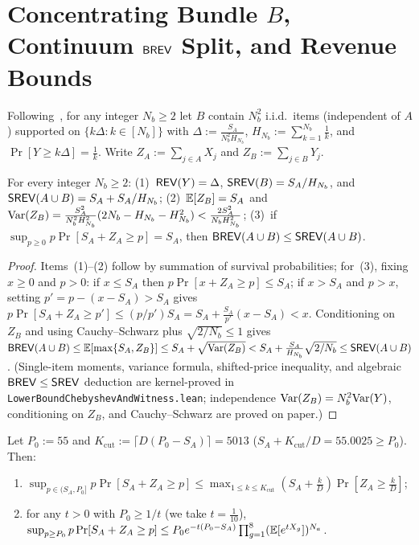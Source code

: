 \section{Concentrating Bundle \texorpdfstring{$B$}{B}, Continuum \texorpdfstring{$\mathsf{BREV}$}{BREV} Split, and Revenue Bounds}\label{sec:lb-bundle}

Following~\cite[Appendix~D]{GiannakopoulosHahn26}, for any integer $N_b \ge 2$ let $B$ contain $N_b^2$ i.i.d.\ items (independent of $A$) supported on $\{k\Delta : k \in [N_b]\}$ with $\Delta := \frac{S_A}{N_b^2 H_{N_b}}$, $H_{N_b} := \sum_{k=1}^{N_b} \frac{1}{k}$, and $\Pr[Y \ge k\Delta] = \frac{1}{k}$. Write $Z_A := \sum_{j\in A} X_j$ and $Z_B := \sum_{j\in B} Y_j$.

\begin{lemma}\label{lem:b-bundle}
For every integer $N_b \ge 2$:
(1)~$\mathsf{REV}(Y) = \Delta$, $\mathsf{SREV}(B) = S_A/H_{N_b}$, and $\mathsf{SREV}(A\cup B) = S_A + S_A/H_{N_b}$;
(2)~$\mathbb{E}[Z_B] = S_A$ and $\mathrm{Var}(Z_B) = \frac{S_A^2}{N_b^2 H_{N_b}^2}(2N_b - H_{N_b} - H_{N_b}^2) < \frac{2S_A^2}{N_b H_{N_b}^2}$;
(3)~if $\sup_{p \ge 0} p\Pr[S_A + Z_A \ge p] = S_A$, then $\mathsf{BREV}(A\cup B) \le \mathsf{SREV}(A\cup B)$.
\end{lemma}

\begin{proof}
Items~(1)--(2) follow by summation of survival probabilities; for~(3), fixing $x \ge 0$ and $p > 0$: if $x \le S_A$ then $p\Pr[x+Z_A \ge p] \le S_A$; if $x > S_A$ and $p > x$, setting $p' = p - (x-S_A) > S_A$ gives $p\Pr[S_A + Z_A \ge p'] \le (p/p')S_A = S_A + \frac{S_A}{p'}(x-S_A) < x$. Conditioning on $Z_B$ and using Cauchy--Schwarz plus $\sqrt{2/N_b} \le 1$ gives $\mathsf{BREV}(A\cup B) \le \mathbb{E}[\max\{S_A, Z_B\}] \le S_A + \sqrt{\mathrm{Var}(Z_B)} < S_A + \frac{S_A}{H_{N_b}}\sqrt{2/N_b} \le \mathsf{SREV}(A\cup B)$. (Single-item moments, variance formula, shifted-price inequality, and algebraic $\mathsf{BREV} \le \mathsf{SREV}$ deduction are kernel-proved in \texttt{LowerBoundChebyshevAndWitness.lean}; independence $\mathrm{Var}(Z_B) = N_b^2\mathrm{Var}(Y)$, conditioning on $Z_B$, and Cauchy--Schwarz are proved on paper.)
\end{proof}

\begin{lemma}\label{lem:brev-split}
Let $P_0 := 55$ and $K_{\mathrm{cut}} := \lceil D(P_0 - S_A)\rceil = 5013$ ($S_A + K_{\mathrm{cut}}/D = 55.0025 \ge P_0$). Then:
\begin{enumerate}
  \item $\sup_{p \in (S_A, P_0]} p\Pr[S_A + Z_A \ge p] \le \max_{1 \le k \le K_{\mathrm{cut}}} (S_A + \frac{k}{D})\Pr[Z_A \ge \frac{k}{D}]$;
  \item for any $t > 0$ with $P_0 \ge 1/t$ (we take $t = \frac{1}{10}$), $\sup_{p \ge P_0} p\Pr[S_A + Z_A \ge p] \le P_0 e^{-t(P_0-S_A)} \prod_{g=1}^8 (\mathbb{E}[e^{tX_g}])^{N_a}$.
\end{enumerate}
\end{lemma}

